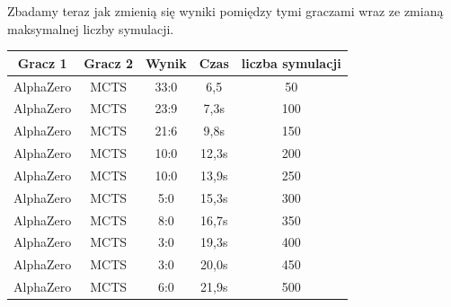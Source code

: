     Zbadamy teraz jak zmienią się wyniki pomiędzy tymi graczami wraz ze zmianą maksymalnej 
    liczby symulacji.

    \begin{longtable}{|c|c|c|c|c|}
      \hline
      \textbf{Gracz 1} & \textbf{Gracz 2} & \textbf{Wynik} & \textbf{Czas} & \textbf{liczba symulacji} \\ \hline
      AlphaZero & MCTS & 33:0 & 6,5 & 50 \\ \hline
      AlphaZero & MCTS & 23:9 & 7,3s & 100 \\ \hline
      AlphaZero & MCTS & 21:6 & 9,8s & 150 \\ \hline
      AlphaZero & MCTS & 10:0 & 12,3s & 200 \\ \hline
      AlphaZero & MCTS & 10:0 & 13,9s & 250 \\ \hline
      AlphaZero & MCTS & 5:0 & 15,3s & 300 \\ \hline
      AlphaZero & MCTS & 8:0 & 16,7s & 350 \\ \hline
      AlphaZero & MCTS & 3:0 & 19,3s & 400 \\ \hline
      AlphaZero & MCTS & 3:0 & 20,0s & 450 \\ \hline
      AlphaZero & MCTS & 6:0 & 21,9s & 500 \\ \hline
      \end{longtable}

